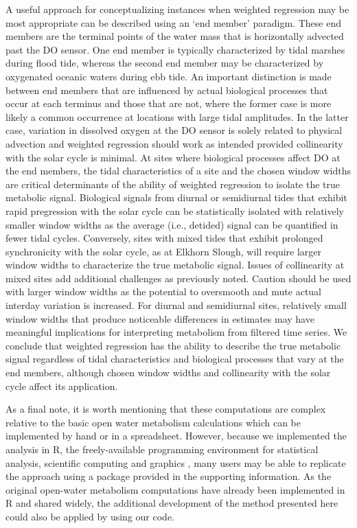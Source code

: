 \documentclass[letterpaper,12pt,oneside]{article}\usepackage[]{graphicx}\usepackage[]{color}
\begin{document}
A useful approach for conceptualizing instances when weighted regression may be most appropriate can be described using an `end member' paradigm.  These end members are the terminal points of the water mass that is horizontally advected past the \ac{DO} sensor.  One end member is typically characterized by tidal marshes during flood tide, whereas the second end member may be characterized by oxygenated oceanic waters during ebb tide.  An important distinction is made between end members that are influenced by actual biological processes that occur at each terminus and those that are not, where the former case is more likely a common occurrence at locations with large tidal amplitudes.  In the latter case, variation in dissolved oxygen at the \ac{DO} sensor is solely related to physical advection and weighted regression should work as intended provided collinearity with the solar cycle is minimal.  At sites where biological processes affect \ac{DO} at the end members, the tidal characteristics of a site and the chosen window widths are critical determinants of the ability of weighted regression to isolate the true metabolic signal.  Biological signals from diurnal or semidiurnal tides that exhibit rapid pregression with the solar cycle can be statistically isolated with relatively smaller window widths as the average (i.e., detided) signal can be quantified in fewer tidal cycles.  Conversely, sites with mixed tides that exhibit prolonged synchronicity with the solar cycle, as at Elkhorn Slough, will require larger window widths to characterize the true metabolic signal.  Issues of collinearity at mixed sites add additional challenges as previously noted.  Caution should be used with larger window widths as the potential to oversmooth and mute actual interday variation is increased.  For diurnal and semidiurnal sites, relatively small window widths that produce noticeable differences in estimates may have meaningful implications for interpreting metabolism from filtered time series.  We conclude that weighted regression has the ability to describe the true metabolic signal regardless of tidal characteristics and biological processes that vary at the end members, although chosen window widths and collinearity with the solar cycle affect its application.

As a final note, it is worth mentioning that these computations are complex relative to the basic open water metabolism calculations which can be implemented by hand or in a spreadsheet.  However, because we implemented the analysis in R, the freely-available programming environment for statistical analysis, scientific computing and graphics , many users may be able to replicate the approach using a package provided in the supporting information.  As the original open-water metabolism computations have already been implemented in R and shared widely, the additional development of the method presented here could also be applied by using our code.
\end{document}
